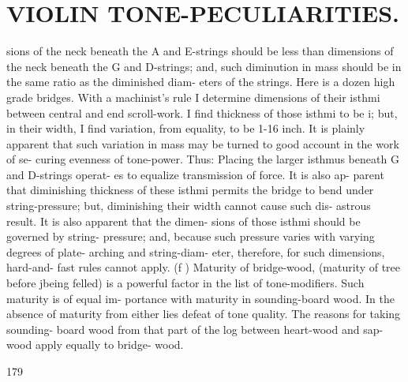 \documentclass{article}
\begin{document}
\section*{VIOLIN TONE-PECULIARITIES.}
sions of the neck beneath the A and E-strings should be less than dimensions of the neck beneath the G and D-strings; and, such diminution in mass should be in the same ratio as the diminished diam- eters of the strings. Here is a dozen high grade bridges. With a machinist's rule I determine dimensions of their isthmi between central and end scroll-work. I find thickness of those isthmi to be i; but, in their width, I find variation, from equality, to be 1-16 inch. It is plainly apparent that such variation in mass may be turned to good account in the work of se- curing evenness of tone-power. Thus: Placing the larger isthmus beneath G and D-strings operat- es to equalize transmission of force. It is also ap- parent that diminishing thickness of these isthmi permits the bridge to bend under string-pressure; but, diminishing their width cannot cause such dis- astrous result. It is also apparent that the dimen- sions of those isthmi should be governed by string- pressure; and, because such pressure varies with varying degrees of plate- arching and string-diam- eter, therefore, for such dimensions, hard-and- fast rules cannot apply. (f ) Maturity of bridge-wood, (maturity of tree before jbeing felled) is a powerful factor in the list of tone-modifiers. Such maturity is of equal im- portance with maturity in sounding-board wood. In the absence of maturity from either lies defeat of tone quality. The reasons for taking sounding- board wood from that part of the log between heart-wood and sap-wood apply equally to bridge- wood.

179
\end{document}
